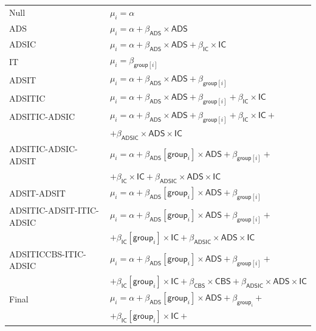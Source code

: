 \documentclass[preprint,12pt]{elsarticle}
\begin{document}
\begin{center}
\begin{tabular}{p{5cm}l}
Null & $\mu_i  = \alpha$\\
ADS & $ \mu_i  = \alpha + \beta_{\mathsf{ADS}}\times \mathsf{ADS}$\\
ADSIC & $ \mu_i  = \alpha + \beta_{\mathsf{ADS}}\times \mathsf{ADS} +    \beta_{\mathsf{IC}}\times \mathsf{IC}$\\
IT & $ \mu_i  = \beta_{\mathsf{group}[i]} $\\
ADSIT & $\mu_i  = \alpha + \beta_{\mathsf{ADS}}\times \mathsf{ADS} +  \beta_{\mathsf{group}[i]}$\\
ADSITIC & $\mu_i  = \alpha + \beta_{\mathsf{ADS}}\times \mathsf{ADS} +  \beta_{\mathsf{group}[i]} +    \beta_{\mathsf{IC}}\times \mathsf{IC}$\\
ADSITIC-ADSIC & $\mu_i  = \alpha + \beta_{\mathsf{ADS}}\times \mathsf{ADS} +  \beta_{\mathsf{group}[i]} +    \beta_{\mathsf{IC}}\times \mathsf{IC} + $\\
& $  +  \beta_{\mathsf{ADSIC}}\times \mathsf{ADS} \times \mathsf{IC}$\\
ADSITIC-ADSIC-ADSIT & $\mu_i  = \alpha + \beta_{\mathsf{ADS}}[\mathsf{group}_i]\times \mathsf{ADS} +  \beta_{\mathsf{group}[i]} + $ \\
& $  +  \beta_{\mathsf{IC}}\times \mathsf{IC} + \beta_{\mathsf{ADSIC}}\times \mathsf{ADS} \times \mathsf{IC}$\\
ADSIT-ADSIT  & $ \mu_i   = \alpha + \beta_{\mathsf{ADS}}[\mathsf{group}_i] \times
 \mathsf{ADS} + \beta_{\mathsf{group}[i]} $\\
ADSITIC-ADSIT-ITIC-ADSIC  & $ \mu_i   = \alpha  +  \beta_{\mathsf{ADS}}[\mathsf{group}_i] \times \mathsf{ADS} + \beta_{\mathsf{group}[i]} + $ \\ 
& $ + 
\beta_{\mathsf{IC}}[\mathsf{group}_i] \times \mathsf{IC}     + \beta_{\mathsf{ADSIC}}\times \mathsf{ADS} \times \mathsf{IC}$\\
ADSITICCBS-ITIC-ADSIC & $\mu_i   = \alpha  +  \beta_{\mathsf{ADS}}[\mathsf{group}_i] \times
 \mathsf{ADS}  + \beta_{\mathsf{group}[i]} + $ \\ 
 &$ +    \beta_{\mathsf{IC}}[\mathsf{group}_i] \times \mathsf{IC}    + \beta_{\mathsf{CBS}} \times \mathsf{CBS} +  \beta_{\mathsf{ADSIC}}\times \mathsf{ADS} \times \mathsf{IC}$  \\
Final & $\mu_i  = \alpha + \beta_{\mathsf{ADS}}[\mathsf{group}_i]\times \mathsf{ADS} + \beta_{\mathsf{group}_i}  +  $ \\ & $ +  \beta_{\mathsf{IC}}[\mathsf{group}_i]\times \mathsf{IC} + $\\

\end{tabular}
\end{center}
\end{document}
